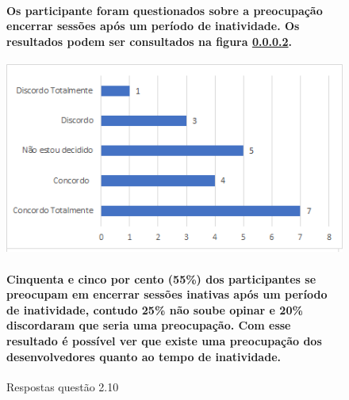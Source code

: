 \begin{figure}[!t]
\centering
\paragraph{Os participante foram questionados sobre a preocupação encerrar sessões após um período de inatividade. Os resultados podem ser consultados na figura \ref{fig:2.10}.}

\includegraphics[scale=0.7]{figuras das questoes/2.10.png}
\caption{Respostas questão 2.10}

\paragraph{Cinquenta e cinco por cento (55{\%}) dos participantes se preocupam em encerrar sessões inativas após um período de inatividade, contudo 25{\%} não soube opinar e 20{\%} discordaram que seria uma preocupação. Com esse resultado é possível  ver que existe uma preocupação dos desenvolvedores quanto ao tempo de inatividade.
}
\label{fig:2.10}
\end{figure}


